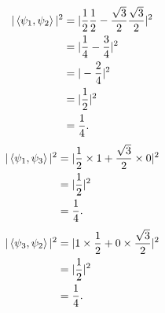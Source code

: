 \documentclass[10pt]{article}
\begin{document}
\begin{align*}
|\braket{\psi_1, \psi_2}|^2 &= | \frac{1}{2} \frac{1}{2} - \frac{\sqrt{3}}{2} \frac{\sqrt{3}}{2} |^2 \\
                                          &= | \frac{1}{4} - \frac{3}{4} |^2 \\
                                          &= | -\frac{2}{4} |^2 \\
                                          &= |\frac{1}{2} |^2 \\
                                          &= \frac{1}{4}.
\end{align*}
\begin{align*}
| \braket{\psi_1, \psi_3} |^2 &= | \frac{1}{2} \times 1 + \frac{\sqrt{3}}{2} \times 0|^2 \\
											  &= | \frac{1}{2} |^2 \\
											  &= \frac{1}{4}.                                          
\end{align*}
\begin{align*}
| \braket{\psi_3, \psi_2} |^2 &= | 1 \times \frac{1}{2} + 0 \times \frac{\sqrt{3}}{2} |^2 \\
											 &= | \frac{1}{2} |^2 \\
											 &= \frac{1}{4}.
\end{align*}
\end{document}
